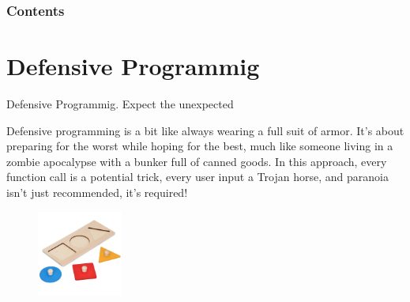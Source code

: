 \documentclass[10pt]{beamer}
\title[Universidad Panamericana]{}
\subtitle{FreeRTOS Architecture Part 1}
\author[]{Name}
\institute[ltonix@up.edu.mx]{Universidad Panamericana}
\date[Presentation \today]{Presentation \today}
\begin{document}
\frame{\titlepage}
\begin{frame}
\frametitle{Contents}
\tableofcontents
\end{frame}



\section{Defensive Programmig}

\begin{frame}{Defensive Programmig. Expect the unexpected}
  
Defensive programming is a bit like always wearing a full suit of armor. It’s about preparing for the worst while hoping for the best, much like someone living in a zombie apocalypse with a bunker full of canned goods. In this approach, every function call is a potential trick, every user input a Trojan horse, and paranoia isn’t just recommended, it’s required!

  \begin{figure}[h]
    \centering
    \includegraphics[width=0.25\textwidth]{figures/BadDummpyProof.png}
    \label{fig:BadDummpyProof}
  \end{figure}


\end{frame}
\end{document}
